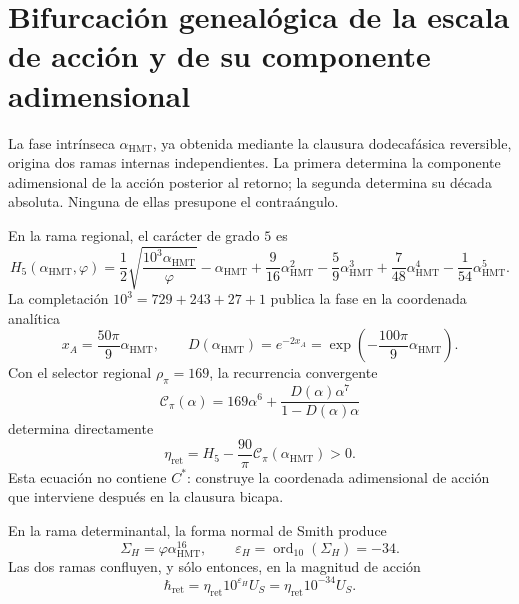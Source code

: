 
\section{Bifurcación genealógica de la escala de acción y de su componente adimensional}
\label{sec:sucesor-102-c14-bifurcacion-accion}

La fase intrínseca \(\alpha_{\mathrm{HMT}}\), ya obtenida mediante la
clausura dodecafásica reversible, origina dos ramas internas independientes.
La primera determina la componente adimensional de la acción posterior al
retorno; la segunda determina su década absoluta. Ninguna de ellas presupone
el contraángulo.

En la rama regional, el carácter de grado \(5\) es
\begin{equation}
 H_5(\alpha_{\mathrm{HMT}},\varphi)
 =\frac12\sqrt{\frac{10^3\alpha_{\mathrm{HMT}}}{\varphi}}
  -\alpha_{\mathrm{HMT}}
  +\frac9{16}\alpha_{\mathrm{HMT}}^2
  -\frac59\alpha_{\mathrm{HMT}}^3
  +\frac7{48}\alpha_{\mathrm{HMT}}^4
  -\frac1{54}\alpha_{\mathrm{HMT}}^5 .
 \label{eq:sucesor-102-c14-h5-preangular}
\end{equation}
La completación \(10^3=729+243+27+1\) publica la fase en la coordenada
analítica
\begin{equation}
 x_A=\frac{50\pi}{9}\alpha_{\mathrm{HMT}},
 \qquad
 D(\alpha_{\mathrm{HMT}})=e^{-2x_A}
 =\exp\!\left(-\frac{100\pi}{9}\alpha_{\mathrm{HMT}}\right).
 \label{eq:sucesor-102-c14-determinante-regional}
\end{equation}
Con el selector regional \(\rho_\pi=169\), la recurrencia convergente
\begin{equation}
 \mathscr C_\pi(\alpha)
 =169\alpha^6+
   \frac{D(\alpha)\alpha^7}{1-D(\alpha)\alpha}
 \label{eq:sucesor-102-c14-recurrencia-regional}
\end{equation}
determina directamente
\begin{equation}
 \boxed{\eta_{\mathrm{ret}}
 =H_5-\frac{90}{\pi}\mathscr C_\pi(\alpha_{\mathrm{HMT}})>0.}
 \label{eq:sucesor-102-c14-eta-directa}
\end{equation}
Esta ecuación no contiene \(C^*\): construye la coordenada adimensional de
acción que interviene después en la clausura bicapa.

En la rama determinantal, la forma normal de Smith produce
\begin{equation}
 \Sigma_H=\varphi\alpha_{\mathrm{HMT}}^{16},
 \qquad
 \varepsilon_H=\operatorname{ord}_{10}(\Sigma_H)=-34.
 \label{eq:sucesor-102-c14-decada-accion}
\end{equation}
Las dos ramas confluyen, y sólo entonces, en la magnitud de acción
\begin{equation}
 \boxed{\hbar_{\mathrm{ret}}
 =\eta_{\mathrm{ret}}10^{\varepsilon_H}U_S
 =\eta_{\mathrm{ret}}10^{-34}U_S.}
 \label{eq:sucesor-102-c14-hbar-tipado}
\end{equation}

